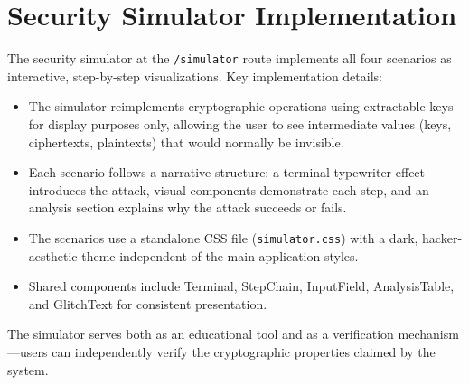 \section{Security Simulator Implementation}

The security simulator at the \texttt{/simulator} route implements all four scenarios as interactive, step-by-step visualizations. Key implementation details:

\begin{itemize}
    \item The simulator reimplements cryptographic operations using extractable keys for display purposes only, allowing the user to see intermediate values (keys, ciphertexts, plaintexts) that would normally be invisible.
    \item Each scenario follows a narrative structure: a terminal typewriter effect introduces the attack, visual components demonstrate each step, and an analysis section explains why the attack succeeds or fails.
    \item The scenarios use a standalone CSS file (\texttt{simulator.css}) with a dark, hacker-aesthetic theme independent of the main application styles.
    \item Shared components include Terminal, StepChain, InputField, AnalysisTable, and GlitchText for consistent presentation.
\end{itemize}

The simulator serves both as an educational tool and as a verification mechanism---users can independently verify the cryptographic properties claimed by the system.
